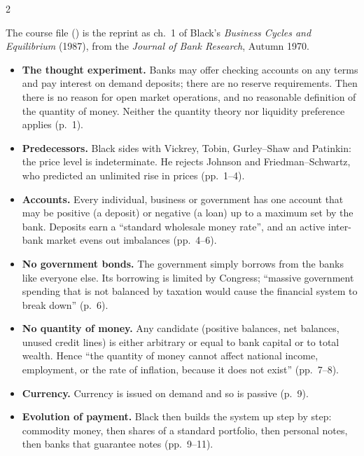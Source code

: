 \begin{paracol}{2}
\begin{reading}
The course file () is the reprint as ch.~1 of Black's \emph{Business Cycles and Equilibrium} (1987), from the \emph{Journal of Bank Research}, Autumn 1970.
\begin{itemize}
  \item \textbf{The thought experiment.} Banks may offer checking accounts on any terms and pay interest on demand deposits; there are no reserve requirements. Then there is no reason for open market operations, and no reasonable definition of the quantity of money. Neither the quantity theory nor liquidity preference applies (p.~1).
  \item \textbf{Predecessors.} Black sides with Vickrey, Tobin, Gurley--Shaw and Patinkin: the price level is indeterminate. He rejects Johnson and Friedman--Schwartz, who predicted an unlimited rise in prices (pp.~1--4).
  \item \textbf{Accounts.} Every individual, business or government has one account that may be positive (a deposit) or negative (a loan) up to a maximum set by the bank. Deposits earn a ``standard wholesale money rate'', and an active inter-bank market evens out imbalances (pp.~4--6).
  \item \textbf{No government bonds.} The government simply borrows from the banks like everyone else. Its borrowing is limited by Congress; ``massive government spending that is not balanced by taxation would cause the financial system to break down'' (p.~6).
  \item \textbf{No quantity of money.} Any candidate (positive balances, net balances, unused credit lines) is either arbitrary or equal to bank capital or to total wealth. Hence ``the quantity of money cannot affect national income, employment, or the rate of inflation, because it does not exist'' (pp.~7--8).
  \item \textbf{Currency.} Currency is issued on demand and so is passive (p.~9).
  \item \textbf{Evolution of payment.} Black then builds the system up step by step: commodity money, then shares of a standard portfolio, then personal notes, then banks that guarantee notes (pp.~9--11).
\end{itemize}
\end{reading}


\end{paracol}
